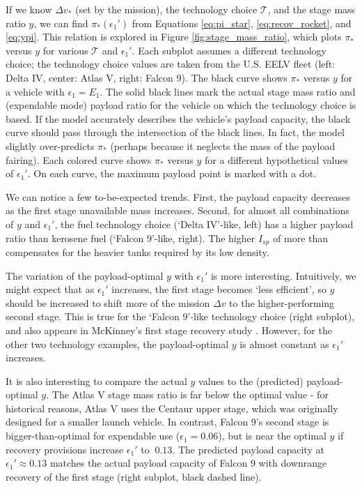 \documentclass[conf]{new-aiaa}
\begin{document}
\begin{table}
\begin{tabular}{p{3cm} M{2.5cm} M{2.5cm} c c c}
		 \hline
	\end{tabular}
\end{table}

If we know $\Delta v_*$ (set by the mission), the technology choice $\mathcal{T}$, and the stage mass ratio $y$, we can find $\pi_*(\epsilon_1')$ from Equations \ref{eq:pi_star}, \ref{eq:recov_rocket}, and \ref{eq:ypi}. This relation is explored in Figure \ref{fig:stage_mass_ratio}, which plots $\pi_*$ versus $y$ for various $\mathcal{T}$ and $\epsilon_1'$. Each subplot assumes a different technology choice; the technology choice values are taken from the U.S. EELV fleet (left: Delta IV, center: Atlas V, right: Falcon 9). The black curve shows $\pi_*$ versus $y$ for a vehicle with $\epsilon_1=E_1$. The solid black lines mark the actual stage mass ratio and (expendable mode) payload ratio for the vehicle on which the technology choice is based. If the model accurately describes the vehicle's payload capacity, the black curve should pass through the intersection of the black lines. In fact, the model slightly over-predicts $\pi_*$ (perhaps because it neglects the mass of the payload fairing).  
Each colored curve shows $\pi_*$ versus $y$ for a different hypothetical values of $\epsilon_1'$. On each curve, the maximum payload point is marked with a dot.

We can notice a few to-be-expected trends. First, the payload capacity decreases as the first stage unavailable mass increases. Second, for almost all combinations of $y$ and $\epsilon_1'$, the  fuel technology choice (`Delta IV'-like, left) has a higher payload ratio than kerosene fuel (`Falcon 9'-like, right). The higher $I_{sp}$ of  more than compensates for the heavier tanks required by its low density.

The variation of the payload-optimal $y$ with $\epsilon_1'$ is more interesting. Intuitively, we might expect that as $\epsilon_1'$ increases, the first stage becomes `less efficient', so $y$ should be increased to shift more of the mission $\Delta v$ to the higher-performing second stage. This is true for the `Falcon 9'-like technology choice (right subplot), and also appears in McKinney's first stage recovery study \cite{McKinney1986}. However, for the other two technology examples, the payload-optimal $y$ is almost constant as $\epsilon_1'$ increases.

It is also interesting to compare the actual $y$ values to the (predicted) payload-optimal $y$. The Atlas V stage mass ratio is far below the optimal value - for historical reasons, Atlas V uses the Centaur upper stage, which was originally designed for a smaller launch vehicle. In contrast, Falcon 9's second stage is bigger-than-optimal for expendable use ($\epsilon_1=0.06$), but is near the optimal $y$ if recovery provisions increase $\epsilon_1'$ to $~0.13$. The predicted payload capacity at $\epsilon_1' \approx 0.13$ matches the actual payload capacity of Falcon 9 with downrange recovery of the first stage (right subplot, black dashed line).
\end{document}
